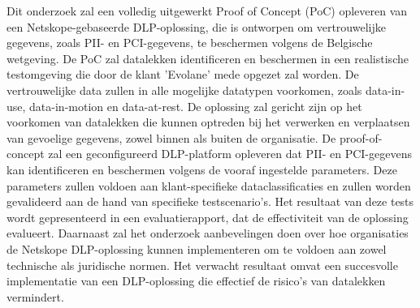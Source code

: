 Dit onderzoek zal een volledig uitgewerkt Proof of Concept (PoC) opleveren van een Netskope-gebaseerde DLP-oplossing, die is ontworpen om vertrouwelijke gegevens, zoals PII- en PCI-gegevens, te beschermen volgens de Belgische wetgeving. De PoC zal datalekken identificeren en beschermen in een realistische testomgeving die door de klant 'Evolane' mede opgezet zal worden. De vertrouwelijke data zullen in alle mogelijke datatypen voorkomen, zoals data-in-use, data-in-motion en data-at-rest. De oplossing zal gericht zijn op het voorkomen van datalekken die kunnen optreden bij het verwerken en verplaatsen van gevoelige gegevens, zowel binnen als buiten de organisatie.
De proof-of-concept zal een geconfigureerd DLP-platform opleveren dat PII- en PCI-gegevens kan identificeren en beschermen volgens de vooraf ingestelde parameters. Deze parameters zullen voldoen aan klant-specifieke dataclassificaties en zullen worden gevalideerd aan de hand van specifieke testscenario's. Het resultaat van deze tests wordt gepresenteerd in een evaluatierapport, dat de effectiviteit van de oplossing evalueert.
Daarnaast zal het onderzoek aanbevelingen doen over hoe organisaties de Netskope DLP-oplossing kunnen implementeren om te voldoen aan zowel technische als juridische normen. Het verwacht resultaat omvat een succesvolle implementatie van een DLP-oplossing die effectief de risico's van datalekken vermindert.




